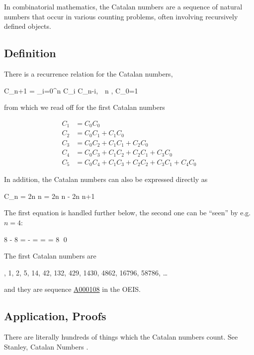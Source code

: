 
In combinatorial mathematics, the Catalan numbers are a sequence of natural numbers that occur in various counting problems, often involving recursively defined objects.

\subsection{Definition}

There is a recurrence relation for the Catalan numbers,

\be\label{2022-06-15:eq1}
C_{n+1} = \sum_{i=0}^n C_i C_{n-i}, \,\, n , \quad C_0=1
\ee

from which we read off for the first Catalan numbers

\begin{align*}
  C_1 &= C_0 C_0 \\
  C_2 &= C_0 C_1 + C_1 C_0 \\
  C_3 &= C_0 C_2 + C_1 C_1 + C_2 C_0 \\
  C_4 &= C_0 C_3 + C_1 C_2 + C_2 C_1 + C_3 C_0 \\
  C_5 &= C_0 C_4 + C_1 C_3 + C_2 C_2 + C_3 C_1 + C_4 C_0
\end{align*}

In addition, the Catalan numbers can also be expressed directly as

\be\label{2022-06-15:eq2}
C_n =  {2n \choose n} = {2n \choose n} - {2n \choose n+1}
\ee

The first equation is handled further below, the second one can be ``seen'' by e.g. $n=4$:

\bee
{8 } - {8 } =  -  =  =    = {8 }  \qed
\eee

The first Catalan numbers are

, 1, 2, 5, 14, 42, 132, 429, 1430, 4862, 16796, 58786, \ldots
\eee

and they are sequence \href{https://oeis.org/A000108}{A000108} in the OEIS.

\subsection{Application, Proofs}

There are literally hundreds of things which the Catalan numbers count. See Stanley, Catalan Numbers .

